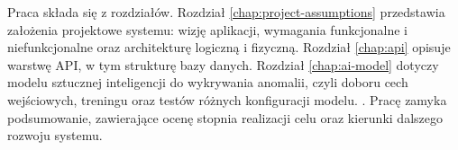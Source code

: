 Praca składa się z  rozdziałów. Rozdział \ref{chap:project-assumptions} przedstawia założenia projektowe systemu: wizję aplikacji, wymagania funkcjonalne i niefunkcjonalne oraz architekturę logiczną i fizyczną. Rozdział \ref{chap:api} opisuje warstwę API, w tym strukturę bazy danych. Rozdział \ref{chap:ai-model} dotyczy modelu sztucznej inteligencji do wykrywania anomalii, czyli doboru cech wejściowych, treningu oraz testów różnych konfiguracji modelu. . Pracę zamyka podsumowanie, zawierające ocenę stopnia realizacji celu oraz kierunki dalszego rozwoju systemu.
